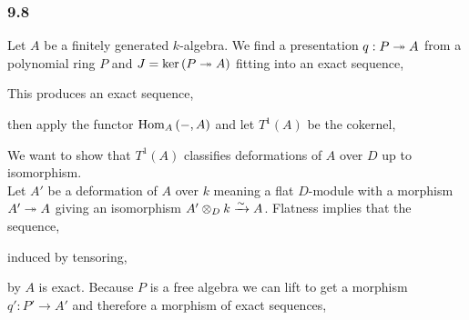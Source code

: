 \documentclass[12pt]{article}
\begin{document}
\subsubsection{9.8}

\newcommand{\Def}[1]{\mathrm{Def}\left( #1 \right)}

Let $A$ be a finitely generated $k$-algebra. We find a presentation $q : P \twoheadrightarrow A$ from a polynomial ring $P$ and $J = \ker{(P \twoheadrightarrow A)}$ fitting into an exact sequence,
\begin{center}
\end{center}
This produces an exact sequence,
\begin{center}
\end{center}
then apply the functor $\mathrm{Hom}_{A} \left( -, A \right)$ and let $T^1(A)$ be the cokernel,
\begin{center}
\end{center}
We want to show that $T^1(A)$ classifies deformations of $A$ over $D$ up to isomorphism.
\bigskip\\
Let $A'$ be a deformation of $A$ over $k$ meaning a flat $D$-module with a morphism $A' \twoheadrightarrow A$ giving an isomorphism $A' \otimes_D k \xrightarrow{\sim} A$. Flatness implies that the sequence,
\begin{center}
\end{center}
induced by tensoring,
\begin{center}
\end{center}
by $A$ is exact. Because $P$ is a free algebra we can lift to get a morphism $q' : P' \to A'$ and therefore a morphism of exact sequences,
\begin{center}
\end{center}
\end{document}
